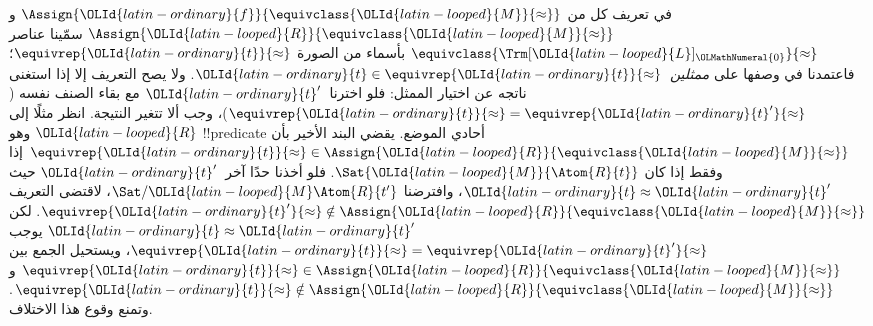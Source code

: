 \documentclass[../../../include/open-logic-section]{subfiles}
\begin{document}
\begin{explain}
في تعريف كل من $\Assign{{\OLId{latin-ordinary}{f}}}{\equivclass{{\OLId{latin-looped}{M}}}{\approx}}$ و
$\Assign{{\OLId{latin-looped}{R}}}{\equivclass{{\OLId{latin-looped}{M}}}{\approx}}$ سمّينا عناصر
$\equivclass{\Trm[{\OLId{latin-looped}{L}}]_{\OLMathNumeral{0}}}{\approx}$ بأسماء من الصورة
$\equivrep{{\OLId{latin-ordinary}{t}}}{\approx}$؛ فاعتمدنا في وصفها على \emph{ممثلين}~${\OLId{latin-ordinary}{t}} \in
\equivrep{{\OLId{latin-ordinary}{t}}}{\approx}$. ولا يصح التعريف إلا إذا استغنى ناتجه عن اختيار
الممثل: فلو اخترنا~${\OLId{latin-ordinary}{t}}'$ مع بقاء الصنف نفسه
($\equivrep{{\OLId{latin-ordinary}{t}}}{\approx} = \equivrep{{\OLId{latin-ordinary}{t}}'}{\approx}$)، وجب ألا تتغير
النتيجة. انظر مثلًا إلى ${\OLId{latin-looped}{R}}$ وهو !!{predicate} أحادي الموضع.
يقضي البند الأخير بأن $\equivrep{{\OLId{latin-ordinary}{t}}}{\approx} \in \Assign{{\OLId{latin-looped}{R}}}{\equivclass{{\OLId{latin-looped}{M}}}{\approx}}$
إذا وفقط إذا كان $\Sat{{\OLId{latin-looped}{M}}}{\Atom{R}{t}}$. فلو أخذنا حدًا آخر~${\OLId{latin-ordinary}{t}}'$
حيث ${\OLId{latin-ordinary}{t}} \approx {\OLId{latin-ordinary}{t}}'$، وافترضنا $\Sat/{{\OLId{latin-looped}{M}}}{\Atom{R}{t'}}$، لاقتضى
التعريف $\equivrep{{\OLId{latin-ordinary}{t}}'}{\approx} \notin \Assign{{\OLId{latin-looped}{R}}}{\equivclass{{\OLId{latin-looped}{M}}}{\approx}}$.
لكن ${\OLId{latin-ordinary}{t}} \approx {\OLId{latin-ordinary}{t}}'$ يوجب $\equivrep{{\OLId{latin-ordinary}{t}}}{\approx} =
\equivrep{{\OLId{latin-ordinary}{t}}'}{\approx}$، ويستحيل الجمع بين
$\equivrep{{\OLId{latin-ordinary}{t}}}{\approx} \in \Assign{{\OLId{latin-looped}{R}}}{\equivclass{{\OLId{latin-looped}{M}}}{\approx}}$ و
$\equivrep{{\OLId{latin-ordinary}{t}}}{\approx} \notin \Assign{{\OLId{latin-looped}{R}}}{\equivclass{{\OLId{latin-looped}{M}}}{\approx}}$.
وتمنع  وقوع هذا الاختلاف.
\end{explain}
\end{document}
